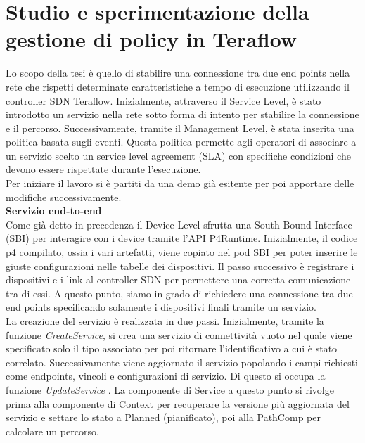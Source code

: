 \chapter{Studio e sperimentazione della gestione di policy in Teraflow}
\label{cap:policy}
Lo scopo della tesi è quello di stabilire una connessione tra due end points nella rete che rispetti determinate caratteristiche
a tempo di esecuzione utilizzando il controller SDN Teraflow.
Inizialmente, attraverso il Service Level, è stato introdotto un servizio nella rete sotto forma di intento per stabilire la connessione e il percorso. 
Successivamente, tramite il Management Level, è stata inserita una politica basata sugli eventi. Questa politica permette agli operatori 
di associare a un servizio scelto un service level agreement (SLA) con specifiche condizioni che devono essere rispettate durante l'esecuzione.
\\Per iniziare il lavoro si è partiti da una demo già esitente per poi apportare delle modifiche successivamente.
\\\textbf{Servizio end-to-end}
\\Come già detto in precedenza il Device Level sfrutta una South-Bound Interface (SBI) per interagire con i device tramite l'API P4Runtime. 
Inizialmente, il codice p4 compilato, ossia i vari artefatti, viene copiato nel pod SBI per poter inserire le giuste configurazioni nelle tabelle dei dispositivi.
Il passo successivo è registrare i dispositivi e i link al controller SDN per permettere una corretta comunicazione tra di essi.
A questo punto, siamo in grado di richiedere una connessione tra due end points specificando solamente i dispositivi finali tramite un servizio.
\\La creazione del servizio è realizzata in due passi. 
Inizialmente, tramite la funzione \textit{CreateService}, si crea una servizio di connettività vuoto nel quale viene specificato solo il tipo associato per poi ritornare l'identificativo a cui è stato correlato.
Successivamente viene aggiornato il servizio popolando i campi richiesti come endpoints, vincoli e configurazioni di servizio. Di questo si occupa la funzione \textit{UpdateService} \cite{D32}.
La componente di Service a questo punto si rivolge prima alla componente di Context per recuperare la versione più aggiornata del servizio e settare lo stato a Planned (pianificato), poi alla PathComp per calcolare un percorso.
